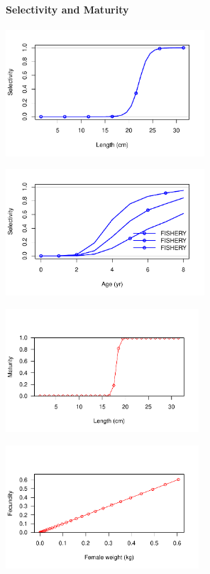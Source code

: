 \documentclass[
  letterpaper,
  DIV=11,
  numbers=noendperiod]{scrartcl}
\let\oldparagraph\paragraph
\renewcommand{\paragraph}[1]{\oldparagraph{#1}\mbox{}}
\begin{document}
\hypertarget{selectivity-and-maturity}{%
\paragraph{Selectivity and Maturity}\label{selectivity-and-maturity}}

\includegraphics[width=7.4cm,height=\textheight]{LUKA_50_Base_model_diags_report_files/figure-pdf/selectivity-1.pdf}

\includegraphics[width=7.4cm,height=\textheight]{LUKA_50_Base_model_diags_report_files/figure-pdf/selectivity-2.pdf}

\includegraphics[width=7.2cm,height=\textheight]{LUKA_50_Base_model_diags_report_files/figure-pdf/maturity-1.pdf}

\includegraphics[width=7.2cm,height=\textheight]{LUKA_50_Base_model_diags_report_files/figure-pdf/maturity-2.pdf}
\end{document}

